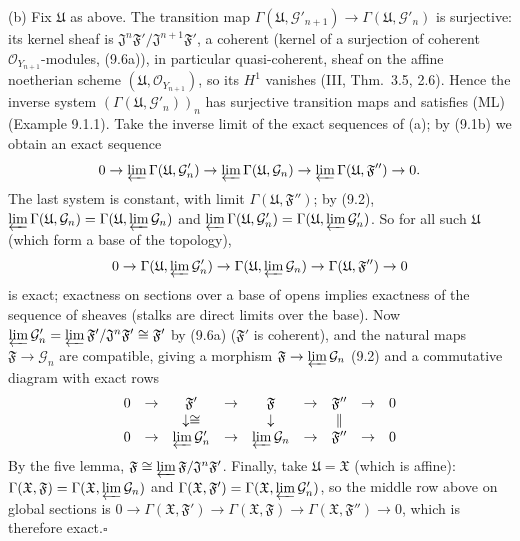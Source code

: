 \documentclass[11pt]{article}
\begin{document}
(b) Fix $\mathfrak U$ as above. The transition map $\Gamma(\mathfrak U,\mathcal G'_{n+1})\to\Gamma(\mathfrak U,\mathcal G'_n)$ is surjective: its kernel sheaf is $\mathfrak J^n\mathfrak F'/\mathfrak J^{n+1}\mathfrak F'$, a coherent (kernel of a surjection of coherent $\mathcal O_{Y_{n+1}}$-modules, (9.6a)), in particular quasi-coherent, sheaf on the affine noetherian scheme $(\mathfrak U,\mathcal O_{Y_{n+1}})$, so its $H^1$ vanishes (III, Thm.~3.5, 2.6). Hence the inverse system $(\Gamma(\mathfrak U,\mathcal G'_n))_n$ has surjective transition maps and satisfies (ML) (Example 9.1.1). Take the inverse limit of the exact sequences of (a); by (9.1b) we obtain an exact sequence
\[0\to\varprojlim\Gamma(\mathfrak U,\mathcal G'_n)\to\varprojlim\Gamma(\mathfrak U,\mathcal G_n)\to\varprojlim\Gamma(\mathfrak U,\mathfrak F'')\to0.\]
The last system is constant, with limit $\Gamma(\mathfrak U,\mathfrak F'')$; by (9.2), $\varprojlim\Gamma(\mathfrak U,\mathcal G_n)=\Gamma(\mathfrak U,\varprojlim\mathcal G_n)$ and $\varprojlim\Gamma(\mathfrak U,\mathcal G'_n)=\Gamma(\mathfrak U,\varprojlim\mathcal G'_n)$. So for all such $\mathfrak U$ (which form a base of the topology),
\[0\to\Gamma(\mathfrak U,\varprojlim\mathcal G'_n)\to\Gamma(\mathfrak U,\varprojlim\mathcal G_n)\to\Gamma(\mathfrak U,\mathfrak F'')\to0\]
is exact; exactness on sections over a base of opens implies exactness of the sequence of sheaves (stalks are direct limits over the base). Now $\varprojlim\mathcal G'_n=\varprojlim\mathfrak F'/\mathfrak J^n\mathfrak F'\cong\mathfrak F'$ by (9.6a) ($\mathfrak F'$ is coherent), and the natural maps $\mathfrak F\to\mathcal G_n$ are compatible, giving a morphism $\mathfrak F\to\varprojlim\mathcal G_n$ (9.2) and a commutative diagram with exact rows
\[\begin{array}{ccccccccc}0&\to&\mathfrak F'&\to&\mathfrak F&\to&\mathfrak F''&\to&0\\&&\downarrow\cong&&\downarrow&&\|&&\\0&\to&\varprojlim\mathcal G'_n&\to&\varprojlim\mathcal G_n&\to&\mathfrak F''&\to&0\end{array}\]
By the five lemma, $\mathfrak F\cong\varprojlim\mathfrak F/\mathfrak J^n\mathfrak F'$. Finally, take $\mathfrak U=\mathfrak X$ (which is affine): $\Gamma(\mathfrak X,\mathfrak F)=\Gamma(\mathfrak X,\varprojlim\mathcal G_n)$ and $\Gamma(\mathfrak X,\mathfrak F')=\Gamma(\mathfrak X,\varprojlim\mathcal G'_n)$, so the middle row above on global sections is $0\to\Gamma(\mathfrak X,\mathfrak F')\to\Gamma(\mathfrak X,\mathfrak F)\to\Gamma(\mathfrak X,\mathfrak F'')\to0$, which is therefore exact.\hfill$\square$
\end{document}
